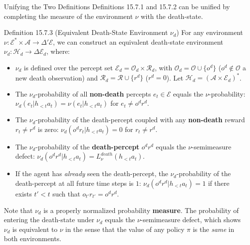 \documentclass[aspectratio=169,10pt]{beamer}
\newcommand{\Ac}{\mathcal{A}}
\newcommand{\Ec}{\mathcal{E}}
\newcommand{\Hc}{\mathcal{H}}
\newcommand{\Oc}{\mathcal{O}}
\newcommand{\Rc}{\mathcal{R}}
\newcommand{\hlt}{h_{<t}}
\newcommand{\od}{o^d}
\newcommand{\rd}{r^d}
\begin{document}
\begin{frame}[allowframebreaks]{Unifying the Two Definitions}
  Definitions 15.7.1 and 15.7.2 can be unified by completing the measure
  of the environment $\nu$ with the death-state.

  \begin{block}{Definition 15.7.3 (Equivalent Death-State Environment $\nu_d$)}
    For any environment $\nu:\Ec^*\times\Ac\to\Delta'\Ec$, we can construct
    an equivalent death-state environment $\nu_d:\Hc_d\to\Delta\Ec_d$,
    where:
    \begin{itemize}
      \item $\nu_d$ is defined over the percept set $\Ec_d=\Oc_d\times\Rc_d$,
        with $\Oc_d=\Oc\cup\{\od\}$ ($\od\notin\Oc$ a new death
        observation) and $\Rc_d=\Rc\cup\{\rd\}$ ($\rd=0$). Let
        $\Hc_d=(\Ac\times\Ec_d)^*$.
      \item The $\nu_d$-probability of all \textbf{non-death} percepts
        $e_t\in\Ec$ equals the $\nu$-probability:
        $\nu_d(e_t|\hlt a_t)=\nu(e_t|\hlt a_t)$ for $e_t\ne\od\rd$.
      \item The $\nu_d$-probability of the death-percept coupled with any
        \textbf{non-death} reward $r_t\ne\rd$ is zero:
        $\nu_d(\od r_t|\hlt a_t)=0$ for $r_t\ne\rd$.

      \framebreak

      \item The $\nu_d$-probability of the \textbf{death-percept} $\od\rd$
        equals the $\nu$-semimeasure defect:
        $\nu_d(\od\rd|\hlt a_t)=L^{death}_\nu(\hlt a_t)$.
      \item If the agent has \emph{already} seen the death-percept, the
        $\nu_d$-probability of the death-percept at all future time steps
        is $1$: $\nu_d(\od\rd|\hlt a_t)=1$ if there exists $t'<t$ such that
        $o_{t'}r_{t'}=\od\rd$.
    \end{itemize}
  \end{block}

  Note that $\nu_d$ is a properly normalized probability \textbf{measure}.
  The probability of entering the death-state under $\nu_d$ equals the
  $\nu$-semimeasure defect, which shows $\nu_d$ is equivalent to $\nu$ in
  the sense that the value of any policy $\pi$ is the \emph{same} in both
  environments.
\end{frame}
\end{document}
